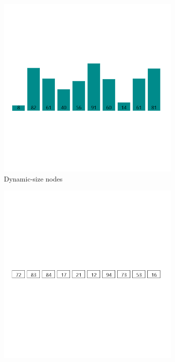 \documentclass[
  field=inf,
  biblatex,
  language=english,
  glossaries,
  theorems=false,
  sourcecodes=false,
  index
]{kidiplom}
\begin{document}
\begin{figure}[H]
	\begin{subfigure}{0.31\textwidth}
		\includegraphics[width=\linewidth]{img/dynamic.png}
		\caption{Dynamic-size nodes} \label{fig:1a}
	\end{subfigure}
	\hspace*{\fill} %
	\begin{subfigure}{0.31\textwidth}
		\includegraphics[width=\linewidth]{img/fixed.png}

\end{subfigure}
\end{figure}
\end{document}
